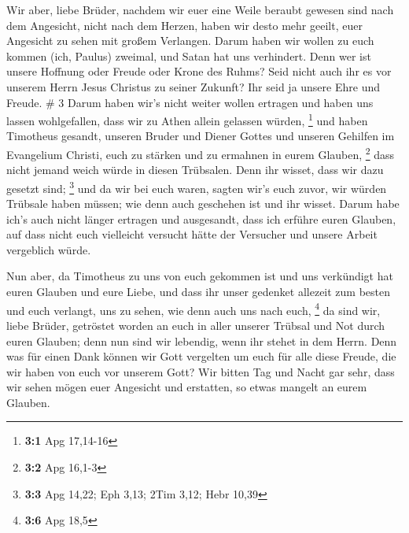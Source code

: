  Wir aber, liebe Brüder, nachdem wir euer eine Weile
beraubt gewesen sind nach dem Angesicht, nicht nach dem Herzen, haben
wir desto mehr geeilt, euer Angesicht zu sehen mit großem Verlangen.
 Darum haben wir wollen zu euch kommen (ich, Paulus)
zweimal, und Satan hat uns verhindert.  Denn wer ist
unsere Hoffnung oder Freude oder Krone des Ruhms? Seid nicht auch ihr es
vor unserem Herrn Jesus Christus zu seiner Zukunft?  Ihr
seid ja unsere Ehre und Freude. \# 3  Darum haben wir's
nicht weiter wollen ertragen und haben uns lassen wohlgefallen, dass wir
zu Athen allein gelassen würden, \footnote{\textbf{3:1} Apg 17,14-16}
 und haben Timotheus gesandt, unseren Bruder und Diener
Gottes und unseren Gehilfen im Evangelium Christi, euch zu stärken und
zu ermahnen in eurem Glauben, \footnote{\textbf{3:2} Apg 16,1-3}
 dass nicht jemand weich würde in diesen Trübsalen. Denn
ihr wisset, dass wir dazu gesetzt sind; \footnote{\textbf{3:3} Apg
  14,22; Eph 3,13; 2Tim 3,12; Hebr 10,39}  und da wir bei
euch waren, sagten wir's euch zuvor, wir würden Trübsale haben müssen;
wie denn auch geschehen ist und ihr wisset.  Darum habe
ich's auch nicht länger ertragen und ausgesandt, dass ich erführe euren
Glauben, auf dass nicht euch vielleicht versucht hätte der Versucher und
unsere Arbeit vergeblich würde.

 Nun aber, da Timotheus zu uns von euch gekommen ist und
uns verkündigt hat euren Glauben und eure Liebe, und dass ihr unser
gedenket allezeit zum besten und euch verlangt, uns zu sehen, wie denn
auch uns nach euch, \footnote{\textbf{3:6} Apg 18,5}  da
sind wir, liebe Brüder, getröstet worden an euch in aller unserer
Trübsal und Not durch euren Glauben;  denn nun sind wir
lebendig, wenn ihr stehet in dem Herrn.  Denn was für
einen Dank können wir Gott vergelten um euch für alle diese Freude, die
wir haben von euch vor unserem Gott?  Wir bitten Tag und
Nacht gar sehr, dass wir sehen mögen euer Angesicht und erstatten, so
etwas mangelt an eurem Glauben.

